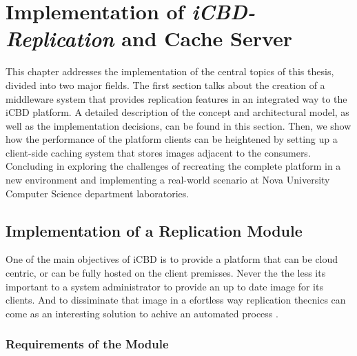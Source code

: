 \chapter{Implementation of \textit{iCBD-Replication} and Cache Server}
\label{cha:replication}

This chapter addresses the implementation of the central topics of this thesis, divided into two major fields.
The first section talks about the creation of a middleware system that provides replication features in an integrated way to the iCBD platform. A detailed description of the concept and architectural model, as well as the implementation decisions, can be found in this section.
Then, we show how the performance of the platform clients can be heightened by setting up a client-side caching system that stores images adjacent to the consumers. Concluding in exploring the challenges of recreating the complete platform in a new environment and implementing a real-world scenario at Nova University Computer Science department laboratories.


\section{Implementation of a Replication Module}
\label{sec:replication_impl}
One of the main objectives of iCBD is to provide a platform that can be cloud centric, or can be fully hosted on the client premisses. Never the the less its important to a system administrator to provide an up to date image for its clients. And to dissiminate that image in a efortless way replication thecnics can come as an interesting solution to achive an automated process .

\subsection{Requirements of the Module}
\label{sub:requirements_icbdrep}


